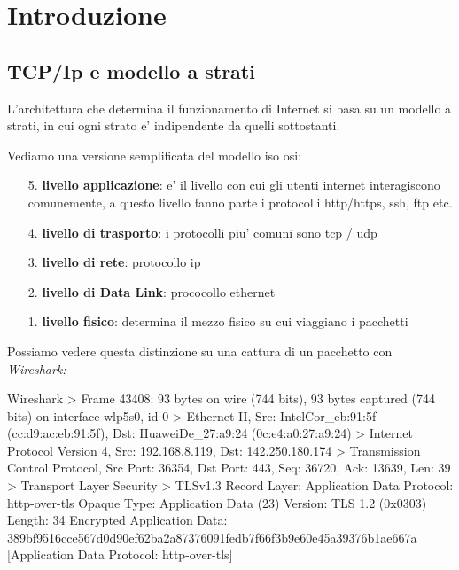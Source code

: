 
\chapter{Introduzione}


\section{TCP/Ip e modello a strati}



L'architettura che determina il funzionamento di Internet si basa su un modello a strati, in cui ogni strato e' indipendente da quelli sottostanti.

Vediamo una versione semplificata del modello iso osi:

\begin{enumerate}
    \item[5.] \textbf{livello applicazione}: e' il livello con cui gli utenti internet interagiscono comunemente, a questo livello fanno parte i protocolli http/https, ssh, ftp etc. 
    \item[4.] \textbf{livello di trasporto}: i protocolli piu' comuni sono tcp / udp
    \item[3.] \textbf{livello di rete}: protocollo ip
    \item[2.] \textbf{livello di Data Link}: prococollo ethernet
    \item[1.] \textbf{livello fisico}: determina il mezzo fisico su cui viaggiano i pacchetti
\end{enumerate}

Possiamo vedere questa distinzione su una cattura di un pacchetto con \it{Wireshark}:

\begin{bashcode}{Wireshark}{}
> Frame 43408: 93 bytes on wire (744 bits), 93 bytes captured (744 bits) on interface wlp5s0, id 0
> Ethernet II, Src: IntelCor_eb:91:5f (cc:d9:ac:eb:91:5f), Dst: HuaweiDe_27:a9:24 (0c:e4:a0:27:a9:24)
> Internet Protocol Version 4, Src: 192.168.8.119, Dst: 142.250.180.174
> Transmission Control Protocol, Src Port: 36354, Dst Port: 443, Seq: 36720, Ack: 13639, Len: 39
> Transport Layer Security
    > TLSv1.3 Record Layer: Application Data Protocol: http-over-tls
            Opaque Type: Application Data (23)
            Version: TLS 1.2 (0x0303)
            Length: 34
            Encrypted Application Data: 389bf9516cce567d0d90ef62ba2a87376091fedb7f66f3b9e60e45a39376b1ae667a
            [Application Data Protocol: http-over-tls]
\end{bashcode}

